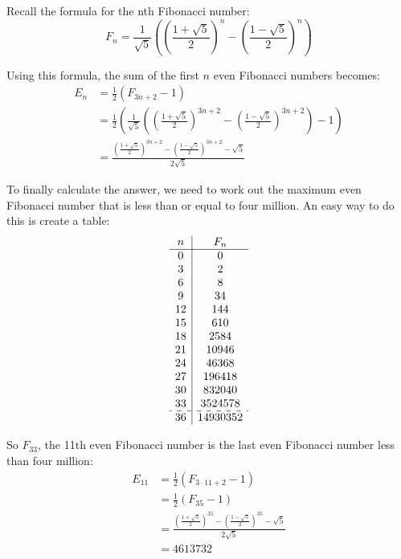 \documentclass{article}
\begin{document}
Recall the formula for the nth Fibonacci number:
\[ F_n = \frac{1}{\sqrt5}\left(\left(\frac{1+\sqrt5}{2}\right)^n
       - \left(\frac{1-\sqrt5}{2}\right)^n\right) \]

Using this formula, the sum of the first \(n\) even Fibonacci numbers becomes:
\[\begin{aligned}
    E_n &= \frac{1}{2} (F_{3n+2} - 1) \\
    &= \frac{1}{2}
        \left(\frac{1}{\sqrt5}\left(\left(\frac{1+\sqrt5}{2}\right)^{3n+2}
        - \left(\frac{1-\sqrt5}{2}\right)^{3n+2}\right) - 1\right) \\
    &= \frac{\left(\frac{1+\sqrt5}{2}\right)^{3n+2}
        - \left(\frac{1-\sqrt5}{2}\right)^{3n+2} - \sqrt5}{2\sqrt5}
\end{aligned}\]

To finally calculate the answer, we need to work out the maximum even Fibonacci
number that is less than or equal to four million. An easy way to do this is
create a table:
\[\begin{array}{c|c}
    n & F_n \\
    \hline
    0 & 0 \\
    3 & 2 \\
    6 & 8 \\
    9 & 34 \\
    12 & 144 \\
    15 & 610 \\
    18 & 2584 \\
    21 & 10946 \\
    24 & 46368 \\
    27 & 196418 \\
    30 & 832040 \\
    33 & 3524578 \\
    \hdashline
    36 & 14930352
\end{array}\]

So \(F_{33}\), the 11th even Fibonacci number is the last even Fibonacci number
less than four million:
\[\begin{aligned}
    E_{11} &= \frac{1}{2}(F_{3\cdot11+2} - 1) \\
    &= \frac{1}{2}(F_{35} - 1) \\
    &= \frac{\left(\frac{1+\sqrt5}{2}\right)^{35}
        - \left(\frac{1-\sqrt5}{2}\right)^{35}
        - \sqrt5}{2\sqrt5} \\
    &= 4613732
\end{aligned}\]
\end{document}
